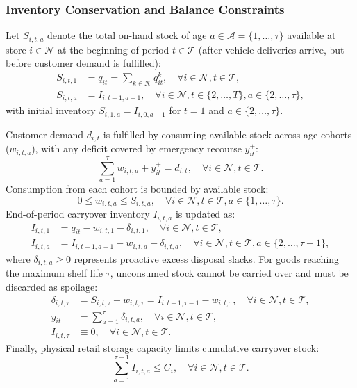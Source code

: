 \documentclass[11pt,a4paper]{article}
\theoremstyle{definition}
\theoremstyle{remark}
\begin{document}
\subsubsection{Inventory Conservation and Balance Constraints}
Let $S_{i,t,a}$ denote the total on-hand stock of age $a \in \mathcal{A} = \{1, \dots, \tau\}$ available at store $i \in \mathcal{N}$ at the beginning of period $t \in \mathcal{T}$ (after vehicle deliveries arrive, but before customer demand is fulfilled):
\begin{align}
    S_{i,t,1} &= q_{it} = \sum_{k \in \mathcal{K}} q_{it}^k, \quad \forall i \in \mathcal{N}, t \in \mathcal{T}, \label{eq:avail_fresh} \\
    S_{i,t,a} &= I_{i,t-1,a-1}, \quad \forall i \in \mathcal{N}, t \in \{2, \dots, T\}, a \in \{2, \dots, \tau\}, \label{eq:avail_inter}
\end{align}
with initial inventory $S_{i,1,a} = I_{i,0,a-1}$ for $t = 1$ and $a \in \{2, \dots, \tau\}$. 

Customer demand $d_{i,t}$ is fulfilled by consuming available stock across age cohorts ($w_{i,t,a}$), with any deficit covered by emergency recourse $y_{it}^+$:
\begin{equation}
    \sum_{a=1}^\tau w_{i,t,a} + y_{it}^+ = d_{i,t}, \quad \forall i \in \mathcal{N}, t \in \mathcal{T}. \label{eq:demand_satisfaction}
\end{equation}
Consumption from each cohort is bounded by available stock:
\begin{equation}
    0 \le w_{i,t,a} \le S_{i,t,a}, \quad \forall i \in \mathcal{N}, t \in \mathcal{T}, a \in \{1, \dots, \tau\}. \label{eq:w_bounds}
\end{equation}
End-of-period carryover inventory $I_{i,t,a}$ is updated as:
\begin{align}
    I_{i,t,1} &= q_{it} - w_{i,t,1} - \delta_{i,t,1}, \quad \forall i \in \mathcal{N}, t \in \mathcal{T}, \label{eq:fresh_inv} \\
    I_{i,t,a} &= I_{i,t-1,a-1} - w_{i,t,a} - \delta_{i,t,a}, \quad \forall i \in \mathcal{N}, t \in \mathcal{T}, a \in \{2, \dots, \tau-1\}, \label{eq:inter_inv}
\end{align}
where $\delta_{i,t,a} \ge 0$ represents proactive excess disposal slacks. For goods reaching the maximum shelf life $\tau$, unconsumed stock cannot be carried over and must be discarded as spoilage:
\begin{align}
    \delta_{i,t,\tau} &= S_{i,t,\tau} - w_{i,t,\tau} = I_{i,t-1,\tau-1} - w_{i,t,\tau}, \quad \forall i \in \mathcal{N}, t \in \mathcal{T}, \label{eq:spoilage_inv} \\
    y_{it}^- &= \sum_{a=1}^\tau \delta_{i,t,a}, \quad \forall i \in \mathcal{N}, t \in \mathcal{T}, \label{eq:total_disposal} \\
    I_{i,t,\tau} &\equiv 0, \quad \forall i \in \mathcal{N}, t \in \mathcal{T}. \label{eq:terminal_inv}
\end{align}
Finally, physical retail storage capacity limits cumulative carryover stock:
\begin{equation}
    \sum_{a=1}^{\tau-1} I_{i,t,a} \le C_i, \quad \forall i \in \mathcal{N}, t \in \mathcal{T}. \label{eq:store_capacity}
\end{equation}
\end{document}
